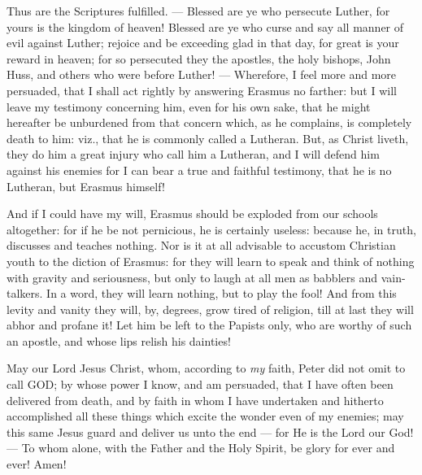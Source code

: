 Thus are the Scriptures fulfilled. — Blessed are ye who persecute Luther, for yours is the kingdom of heaven! Blessed are ye who curse and say all manner of evil against Luther; rejoice and be exceeding glad in that day, for great is your reward in heaven; for so persecuted they the apostles, the holy bishops, John Huss, and others who were before Luther! — Wherefore, I feel more and more persuaded, that I shall act rightly by answering Erasmus no farther: but I will leave my testimony concerning him, even for his own sake, that he might hereafter be unburdened from that concern which, as he complains, is completely death to him: viz., that he is commonly called a Lutheran. But, as Christ liveth, they do him a great injury who call him a Lutheran, and I will defend him against his enemies for I can bear a true and faithful testimony, that he is no Lutheran, but Erasmus himself!

And if I could have my will, Erasmus should be exploded from our schools altogether: for if he be not pernicious, he is certainly useless: because he, in truth, discusses and teaches nothing. Nor is it at all advisable to accustom Christian youth to the diction of Erasmus: for they will learn to speak and think of nothing with gravity and seriousness, but only to laugh at all men as babblers and vain-talkers. In a word, they will learn nothing, but to play the fool! And from this levity and vanity they will, by, degrees, grow tired of religion, till at last they will abhor and profane it! Let him be left to the Papists only, who are worthy of such an apostle, and whose lips relish his dainties!

May our Lord Jesus Christ, whom, according to \emph{my }faith, Peter did not omit to call \textsc{GOD}; by whose power I know, and am persuaded, that I have often been delivered from death, and by faith in whom I have undertaken and hitherto accomplished all these things which excite the wonder even of my enemies; may this same Jesus guard and deliver us unto the end — for He is the Lord our God! — To whom alone, with the Father and the Holy Spirit, be glory for ever and ever! Amen!

